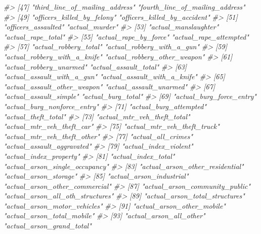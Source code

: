 \documentclass[
]{krantz}
\makeatletter
\newenvironment{Shaded}{\begin{snugshade}}{\end{snugshade}}
\newcommand{\CommentTok}[1]{\textcolor[rgb]{0.37,0.37,0.37}{\textit{#1}}}
\newenvironment{kframe}{%
\medskip{}
\setlength{\fboxsep}{.8em}
 \def\at@end@of@kframe{}%
 \ifinner\ifhmode%
  \def\at@end@of@kframe{\end{minipage}}%
  \begin{minipage}{\columnwidth}%
 \fi\fi%
 \def\FrameCommand##1{\hskip\@totalleftmargin \hskip-\fboxsep
 \colorbox{shadecolor}{##1}\hskip-\fboxsep
     \hskip-\linewidth \hskip-\@totalleftmargin \hskip\columnwidth}%
 \MakeFramed {\advance\hsize-\width
   \@totalleftmargin\z@ \linewidth\hsize
   \@setminipage}}%
 {\par\unskip\endMakeFramed%
 \at@end@of@kframe}
\renewenvironment{Shaded}{\begin{kframe}}{\end{kframe}}
\makeatother
\begin{document}
\begin{Shaded}
\begin{Highlighting}[]
\CommentTok{\#\textgreater{}  [47] "third\_line\_of\_mailing\_address"    "fourth\_line\_of\_mailing\_address"  }
\CommentTok{\#\textgreater{}  [49] "officers\_killed\_by\_felony"        "officers\_killed\_by\_accident"     }
\CommentTok{\#\textgreater{}  [51] "officers\_assaulted"               "actual\_murder"                   }
\CommentTok{\#\textgreater{}  [53] "actual\_manslaughter"              "actual\_rape\_total"               }
\CommentTok{\#\textgreater{}  [55] "actual\_rape\_by\_force"             "actual\_rape\_attempted"           }
\CommentTok{\#\textgreater{}  [57] "actual\_robbery\_total"             "actual\_robbery\_with\_a\_gun"       }
\CommentTok{\#\textgreater{}  [59] "actual\_robbery\_with\_a\_knife"      "actual\_robbery\_other\_weapon"     }
\CommentTok{\#\textgreater{}  [61] "actual\_robbery\_unarmed"           "actual\_assault\_total"            }
\CommentTok{\#\textgreater{}  [63] "actual\_assault\_with\_a\_gun"        "actual\_assault\_with\_a\_knife"     }
\CommentTok{\#\textgreater{}  [65] "actual\_assault\_other\_weapon"      "actual\_assault\_unarmed"          }
\CommentTok{\#\textgreater{}  [67] "actual\_assault\_simple"            "actual\_burg\_total"               }
\CommentTok{\#\textgreater{}  [69] "actual\_burg\_force\_entry"          "actual\_burg\_nonforce\_entry"      }
\CommentTok{\#\textgreater{}  [71] "actual\_burg\_attempted"            "actual\_theft\_total"              }
\CommentTok{\#\textgreater{}  [73] "actual\_mtr\_veh\_theft\_total"       "actual\_mtr\_veh\_theft\_car"        }
\CommentTok{\#\textgreater{}  [75] "actual\_mtr\_veh\_theft\_truck"       "actual\_mtr\_veh\_theft\_other"      }
\CommentTok{\#\textgreater{}  [77] "actual\_all\_crimes"                "actual\_assault\_aggravated"       }
\CommentTok{\#\textgreater{}  [79] "actual\_index\_violent"             "actual\_index\_property"           }
\CommentTok{\#\textgreater{}  [81] "actual\_index\_total"               "actual\_arson\_single\_occupancy"   }
\CommentTok{\#\textgreater{}  [83] "actual\_arson\_other\_residential"   "actual\_arson\_storage"            }
\CommentTok{\#\textgreater{}  [85] "actual\_arson\_industrial"          "actual\_arson\_other\_commercial"   }
\CommentTok{\#\textgreater{}  [87] "actual\_arson\_community\_public"    "actual\_arson\_all\_oth\_structures" }
\CommentTok{\#\textgreater{}  [89] "actual\_arson\_total\_structures"    "actual\_arson\_motor\_vehicles"     }
\CommentTok{\#\textgreater{}  [91] "actual\_arson\_other\_mobile"        "actual\_arson\_total\_mobile"       }
\CommentTok{\#\textgreater{}  [93] "actual\_arson\_all\_other"           "actual\_arson\_grand\_total"        }

\end{Highlighting}
\end{Shaded}
\end{document}
